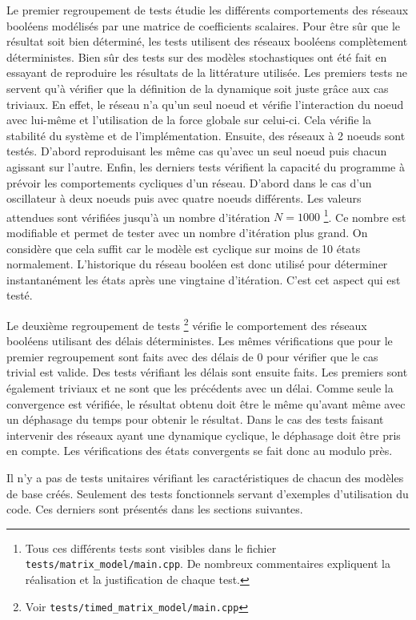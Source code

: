 \documentclass[11pt, a4paper]{article}
\begin{document}
Le premier regroupement de tests étudie les différents comportements des
réseaux booléens modélisés par une matrice de coefficients scalaires. Pour être
sûr que le résultat soit bien déterminé, les tests utilisent des réseaux
booléens complètement déterministes. Bien sûr des tests sur des modèles
stochastiques ont été fait en essayant de reproduire les résultats de la
littérature utilisée. Les premiers tests ne servent qu'à vérifier que la
définition de la dynamique soit juste grâce aux cas triviaux. En effet, le
réseau n'a qu'un seul noeud et vérifie l'interaction du noeud avec lui-même et
l'utilisation de la force globale sur celui-ci. Cela vérifie la stabilité du
système et de l'implémentation. Ensuite, des réseaux à 2 noeuds sont testés.
D'abord reproduisant les même cas qu'avec un seul noeud puis chacun agissant
sur l'autre. Enfin, les derniers tests vérifient la capacité du programme à
prévoir les comportements cycliques d'un réseau. D'abord dans le cas d'un
oscillateur à deux noeuds puis avec quatre noeuds différents. Les valeurs
attendues sont vérifiées jusqu'à un nombre d'itération $N = 1000$ \footnote{Tous
ces différents tests sont visibles dans le fichier
\texttt{tests/matrix\_model/main.cpp}. De nombreux commentaires expliquent la
réalisation et la justification de chaque test.}. Ce nombre est modifiable et
permet de tester avec un nombre d'itération plus grand. On considère que cela
suffit car le modèle est cyclique sur moins de 10 états normalement.
L'historique du réseau booléen est donc utilisé pour déterminer instantanément
les états après une vingtaine d'itération. C'est cet aspect qui est testé.

Le deuxième regroupement de tests \footnote{Voir
\texttt{tests/timed\_matrix\_model/main.cpp}} vérifie le comportement des
réseaux booléens utilisant des délais déterministes. Les mêmes vérifications
que pour le premier regroupement sont faits avec des délais de 0 pour vérifier
que le cas trivial est valide. Des tests vérifiant les délais sont ensuite
faits.  Les premiers sont également triviaux et ne sont que les précédents avec
un délai. Comme seule la convergence est vérifiée, le résultat obtenu doit
être le même qu'avant même avec un déphasage du temps pour obtenir le résultat.
Dans le cas des tests faisant intervenir des réseaux ayant une dynamique
cyclique, le déphasage doit être pris en compte. Les vérifications des états
convergents se fait donc au modulo près.

Il n'y a pas de tests unitaires vérifiant les caractéristiques de chacun des
modèles de base créés. Seulement des tests fonctionnels servant d'exemples
d'utilisation du code. Ces derniers sont présentés dans les sections suivantes.
\end{document}
